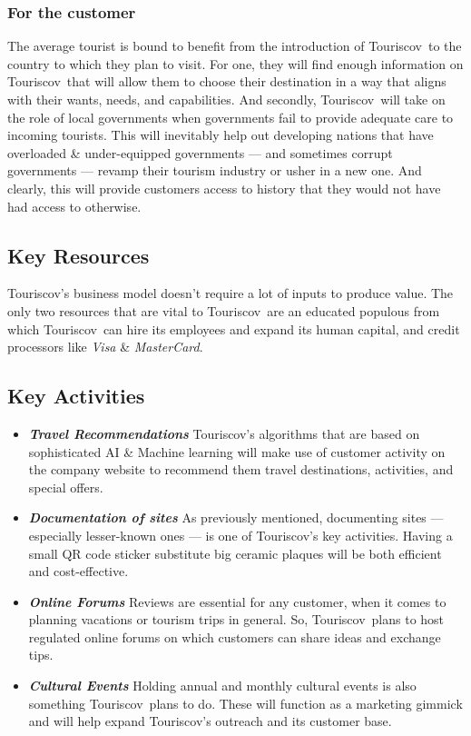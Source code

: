 \documentclass[12pt]{article}
\newcommand{\bb}[1]{\textbf{\textit{#1}}}
\newcommand{\tco}{Touriscov}
\begin{document}
\subsubsection{For the customer}
The average tourist is bound to benefit from the introduction of \tco\ to the country to which they plan to visit. For one, they will find enough information on \tco\ that will allow them to choose their destination in a way that aligns with their wants, needs, and capabilities. And secondly, \tco\ will take on the role of local governments when governments fail to provide adequate care to incoming tourists. This will inevitably help out developing nations that have overloaded \& under-equipped governments --- and sometimes corrupt governments --- revamp their tourism industry or usher in a new one. And clearly, this will provide customers access to history that they would not have had access to otherwise.

\subsection{Key Resources}
Touriscov's business model doesn't require a lot of inputs to produce value. The only two resources that are vital to \tco\ are an educated populous from which \tco\ can hire its employees and expand its human capital, and credit processors like \textit{Visa} \& \textit{MasterCard}.


\subsection{Key Activities}

 \begin{itemize}
     \item \bb{Travel Recommendations} Touriscov's algorithms that are based on sophisticated AI \& Machine learning will make use of customer activity on the company website to recommend them travel destinations, activities, and special offers.
     \item \bb{Documentation of sites} As previously mentioned, documenting sites --- especially lesser-known ones --- is one of Touriscov's key activities. Having a small QR code sticker substitute big ceramic plaques will be both efficient and cost-effective. 
     \item \bb{Online Forums} Reviews are essential for any customer, when it comes to planning vacations or tourism trips in general. So, \tco\ plans to host regulated online forums on which customers can share ideas and exchange tips.
     \item \bb{Cultural Events} Holding annual and monthly cultural events is also something \tco\ plans to do. These will function as a marketing gimmick and will help expand Touriscov's outreach and its customer base.
 \end{itemize}
\end{document}
